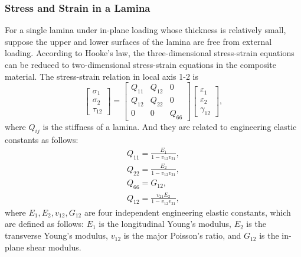 \subsubsection{Stress and Strain in a Lamina}
For a single lamina under in-plane loading whose thickness is relatively small,
suppose the upper and lower surfaces of the lamina are free from external
loading. According to Hooke's law, the three-dimensional stress-strain
equations can be reduced to two-dimensional stress-strain equations in the
composite material. The stress-strain relation in local axis 1-2 is
\begin{equation}
	\left[
		\begin{array}{l}
        	\sigma _1\\
        	\sigma _2\\
        	\tau_{12}
    	\end{array}
	\right]
    =
	\left[
		\begin{array}{ccc}
        	Q_{11} & Q_{12} & 0\\
        	Q_{12} & Q_{22} & 0\\
        	0      & 0     & Q_{66}
    	\end{array}
	\right]
	\left[
		\begin{array}{l}
        	\varepsilon_1\\
        	\varepsilon_2\\
			\gamma_{12}
		\end{array} 
	\right]\textstyle{,}
\end{equation}
where $Q_{ij} $ is the stiffness of a lamina. And they are related to
engineering elastic constants as follows:
\begin{equation}
	\begin{array}{l}
		Q_{11}=\frac{E_1}{1-v_{12}v_{21}} \textstyle{,} \\
    	Q_{22}=\frac{E_2}{1-v_{12}v_{21}} \textstyle{,}\\
    	Q_{66}=G_{12} \textstyle{,}\\
    	Q_{12}=\frac{v_{21}E_2}{1-v_{12}v_{21}} \textstyle{,}
    \end{array}
\end{equation}
where $E_1, E_2, v_{12}, G_{12} $ are four independent engineering elastic
constants, which are defined as follows: $E_1 $ is the longitudinal Young's
modulus, $E_2 $ is the transverse Young's modulus, $v_{12} $ is the major
Poisson's ratio, and $G_{12} $ is the in-plane shear modulus.

